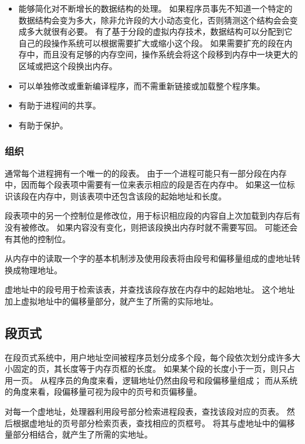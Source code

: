 {{{            \begin{itemize}
                \item
                {
                    能够简化对不断增长的数据结构的处理。
                    如果程序员事先不知道一个特定的数据结构会变为多大，除非允许段的大小动态变化，否则猜测这个结构会会变成多大就很有必要。
                    有了基于分段的虚拟内存技术，数据结构可以分配到它自己的段操作系统可以根据需要扩大或缩小这个段。
                    如果需要扩充的段在内存中，而且没有足够的内存空间，操作系统会将这个段移到内存中一块更大的区域或把这个段换出内存。
                }
                \item 可以单独修改或重新编译程序，而不需重新链接或加载整个程序集。
                \item 有助于进程间的共享。
                \item 有助于保护。
            \end{itemize}
        }

        \subsubsection{组织}
        {
            通常每个进程拥有一个唯一的的段表。
            由于一个进程可能只有一部分段在内存中，因而每个段表项中需要有一位来表示相应的段是否在内存中。
            如果这一位标识该段在内存中，则该表项中还包含该段的起始地址和长度。

            段表项中的另一个控制位是修改位，用于标识相应段的内容自上次加载到内存后有没有被修改。
            如果内容没有变化，则把该段换出内存时就不需要写回。
            可能还会有其他的控制位。

            从内存中的读取一个字的基本机制涉及使用段表将由段号和偏移量组成的虚地址转换成物理地址。

            虚地址中的段号用于检索该表，并查找该段存放在内存中的起始地址。
            这个地址加上虚拟地址中的偏移量部分，就产生了所需的实际地址。
        }
    }

    \subsection{段页式}
    {
        在段页式系统中，用户地址空间被程序员划分成多个段，每个段依次划分成许多大小固定的页，其长度等于内存页框的长度。
        如果某个段的长度小于一页，则只占用一页。
        从程序员的角度来看，逻辑地址仍然由段号和段偏移量组成；
        而从系统的角度来看，段偏移量可视为段中的页号和页偏移量。

        对每一个虚地址，处理器利用段号部分检索进程段表，查找该段对应的页表。
        然后根据虚地址的页号部分检索页表，查找相应的页框号。
        将其与虚地址中的偏移量部分相结合，就产生了所需的实地址。
    }

}
